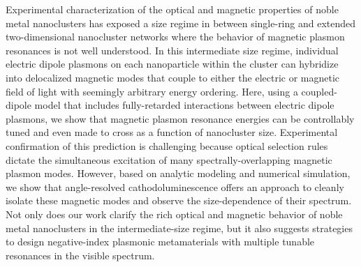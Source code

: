\documentclass [11pt, proquest] {uwthesis}[2016/11/22]
\begin{document}
Experimental characterization of the optical and magnetic properties of noble metal nanoclusters has exposed a size regime in between single-ring and extended two-dimensional nanocluster networks where the behavior of magnetic plasmon resonances is not well understood. In this intermediate size regime, individual electric dipole plasmons on each nanoparticle within the cluster can hybridize into delocalized magnetic modes that couple to either the electric or magnetic field of light with seemingly arbitrary energy ordering. Here, using a coupled-dipole model that includes fully-retarded interactions between electric dipole plasmons, we show that magnetic plasmon resonance energies can be controllably tuned and even made to cross as a function of nanocluster size. Experimental confirmation of this prediction is challenging because optical selection rules dictate the simultaneous excitation of many spectrally-overlapping magnetic plasmon modes. However, based on analytic modeling and numerical simulation, we show that angle-resolved cathodoluminescence offers an approach to cleanly isolate these magnetic modes and observe the size-dependence of their spectrum. Not only does our work clarify the rich optical and magnetic behavior of noble metal nanoclusters in the intermediate-size regime, but it also suggests strategies to design negative-index plasmonic metamaterials with multiple tunable resonances in the visible spectrum.
\end{document}
